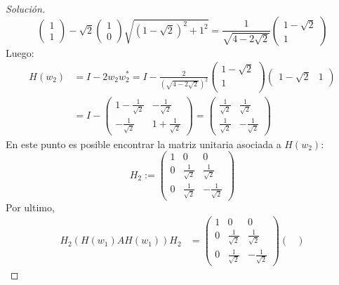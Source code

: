 \documentclass[12pt]{book}
\newenvironment{solucion}
  {\renewcommand\qedsymbol{$\square$}\begin{proof}[Solución]}
  {\end{proof}}
\begin{document}
\begin{solucion}
\[{\begin{pmatrix}
            1\\
            1
        \end{pmatrix}-\sqrt{2}\begin{pmatrix}
            1\\
            0
        \end{pmatrix}}{\sqrt{\left(1-\sqrt{2}\right)^2+1^2}}=\frac{1}{\sqrt{4-2\sqrt{2}}}\begin{pmatrix}
            1-\sqrt{2}\\
            1
        \end{pmatrix}
    \]
Luego:
\begin{align*}
    H(w_2)&=I-2w_2w_2^*=I-\frac{2}{\left(\sqrt{4-2\sqrt{2}}\right)^2}\begin{pmatrix}
        1-\sqrt{2}\\
        1\\
    \end{pmatrix}\begin{pmatrix}
        1-\sqrt{2} & 1
    \end{pmatrix}\\
    &=I-\begin{pmatrix}
        1-\frac{1}{\sqrt{2}} & -\frac{1}{\sqrt{2}}\\
        -\frac{1}{\sqrt{2}} & 1+\frac{1}{\sqrt{2}}
    \end{pmatrix}=\begin{pmatrix}
        \frac{1}{\sqrt{2}} & \frac{1}{\sqrt{2}}\\
        \frac{1}{\sqrt{2}} & -\frac{1}{\sqrt{2}}
    \end{pmatrix}
\end{align*}
En este punto es posible encontrar la matriz unitaria asociada a $H(w_2)$:
    \[
        H_2:=\begin{pmatrix}
            1 & 0 & 0\\
            0 & \frac{1}{\sqrt{2}} & \frac{1}{\sqrt{2}}\\
            0 & \frac{1}{\sqrt{2}} & -\frac{1}{\sqrt{2}}
        \end{pmatrix}
    \]
Por ultimo,
\begin{align*}
    H_2\left(H(w_1)AH(w_1)\right)H_2&=\begin{pmatrix}
        1 & 0 & 0\\
        0 & \frac{1}{\sqrt{2}} & \frac{1}{\sqrt{2}}\\
        0 & \frac{1}{\sqrt{2}} & -\frac{1}{\sqrt{2}}
    \end{pmatrix}\begin{pmatrix}

\end{pmatrix}
\end{align*}
\end{solucion}
\end{document}
